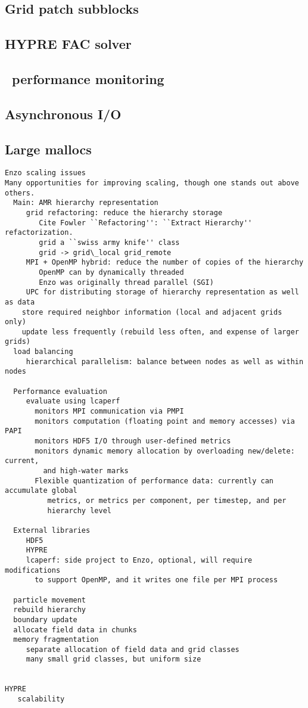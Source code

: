 \documentclass{article}
\begin{document}
\subsection{Grid patch subblocks} \label{solution:parallel-subblocks}
\subsection{HYPRE FAC solver}  \label{solution:method-hypre-fac}
\subsection{\lcaperf\ performance monitoring} \label{solution:performance-lcaperf}
\subsection{Asynchronous I/O} \label{solution:data-io-asynch}
\subsection{Large mallocs} \label{solution:memory-management}




\begin{verbatim}
Enzo scaling issues
Many opportunities for improving scaling, though one stands out above others.
  Main: AMR hierarchy representation
     grid refactoring: reduce the hierarchy storage
        Cite Fowler ``Refactoring'': ``Extract Hierarchy'' refactorization.
        grid a ``swiss army knife'' class
        grid -> grid\_local grid_remote
     MPI + OpenMP hybrid: reduce the number of copies of the hierarchy
        OpenMP can by dynamically threaded
        Enzo was originally thread parallel (SGI)
     UPC for distributing storage of hierarchy representation as well as data
    store required neighbor information (local and adjacent grids only)
    update less frequently (rebuild less often, and expense of larger grids)
  load balancing
     hierarchical parallelism: balance between nodes as well as within nodes

  Performance evaluation     
     evaluate using lcaperf
       monitors MPI communication via PMPI
       monitors computation (floating point and memory accesses) via PAPI
       monitors HDF5 I/O through user-defined metrics
       monitors dynamic memory allocation by overloading new/delete: current,
         and high-water marks
       Flexible quantization of performance data: currently can accumulate global
          metrics, or metrics per component, per timestep, and per
          hierarchy level

  External libraries
     HDF5
     HYPRE
     lcaperf: side project to Enzo, optional, will require modifications
       to support OpenMP, and it writes one file per MPI process
    
  particle movement
  rebuild hierarchy
  boundary update
  allocate field data in chunks
  memory fragmentation
     separate allocation of field data and grid classes
     many small grid classes, but uniform size
  

HYPRE 
   scalability
\end{verbatim}

\end{document}
